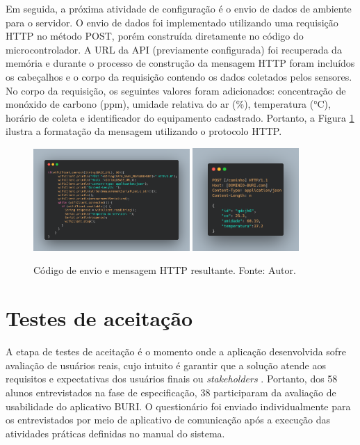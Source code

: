 Em seguida, a próxima atividade de configuração é o envio de dados de ambiente para o servidor. O envio de dados foi implementado utilizando uma requisição HTTP no método POST, porém 
construída diretamente no código do microcontrolador. A URL da API (previamente configurada) foi recuperada da memória e durante o processo de construção da mensagem HTTP foram 
incluídos os cabeçalhos e o corpo da requisição contendo os dados coletados pelos sensores. No corpo da requisição, os seguintes valores foram adicionados: concentração de monóxido de carbono (ppm), umidade relativa do ar (\%), 
temperatura (°C), horário de coleta e identificador do equipamento cadastrado. Portanto, a Figura \ref{figPostMeasurement} ilustra a formatação da mensagem utilizando o protocolo HTTP.

\begin{figure}[ht]
    \centering
    \includegraphics[width=0.53\textwidth]{img/POST-esp32-code.png}
    \hfill
    \includegraphics[width=0.36\textwidth]{img/POST-result.png}
    \caption{Código de envio e mensagem HTTP resultante. Fonte: Autor.}\label{figPostMeasurement}
\end{figure}

\section{Testes de aceitação}\label{fase5}

A etapa de testes de aceitação é o momento onde a aplicação desenvolvida sofre avaliação 
de usuários reais, cujo intuito é garantir que a solução atende aos requisitos e expectativas dos usuários finais ou \textit{stakeholders} \cite{system-design-IOT}. 
Portanto, dos 58 alunos entrevistados na fase de especificação, 38 participaram da avaliação de usabilidade do 
aplicativo BURI. O questionário foi enviado individualmente para os entrevistados por meio de aplicativo de comunicação após 
a execução das atividades práticas definidas no manual do sistema.

